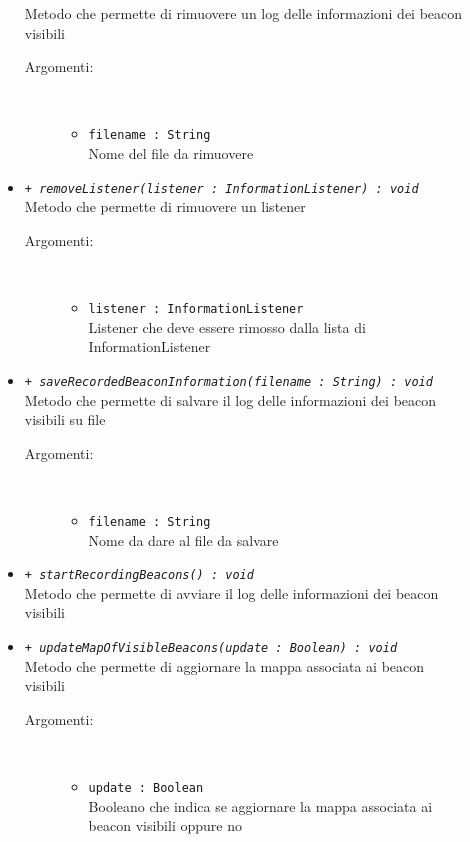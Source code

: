 \documentclass[../DefinizioneDiProdotto.tex]{subfiles}
\begin{document}
\begin{description}
\begin{itemize}
		Metodo che permette di rimuovere un log delle informazioni dei beacon visibili
		\begin{description}
			\item[Argomenti:] \
			\begin{itemize}
				\item \texttt{filename : String}\\
				Nome del file da rimuovere\end{itemize}
		\end{description}
		\item \texttt{+ \textit{removeListener(listener : InformationListener) : void}}\\
		Metodo che permette di rimuovere un listener
		\begin{description}
			\item[Argomenti:] \
			\begin{itemize}
				\item \texttt{listener : InformationListener}\\
				Listener che deve essere rimosso dalla lista di InformationListener\end{itemize}
		\end{description}
		\item \texttt{+ \textit{saveRecordedBeaconInformation(filename : String) : void}}\\
		Metodo che permette di salvare il log delle informazioni dei beacon visibili su file
		\begin{description}
			\item[Argomenti:] \
			\begin{itemize}
				\item \texttt{filename : String}\\
				Nome da dare al file da salvare\end{itemize}
		\end{description}
		\item \texttt{+ \textit{startRecordingBeacons() : void}}\\
		Metodo che permette di avviare il log delle informazioni dei beacon visibili
		\item \texttt{+ \textit{updateMapOfVisibleBeacons(update : Boolean) : void}}\\
		Metodo che permette di aggiornare la mappa associata ai beacon visibili
		\begin{description}
			\item[Argomenti:] \
			\begin{itemize}
				\item \texttt{update : Boolean}\\
				Booleano che indica se aggiornare la mappa associata ai beacon visibili oppure no\end{itemize}
		\end{description}
	\end{itemize}
\end{description}
\end{document}
